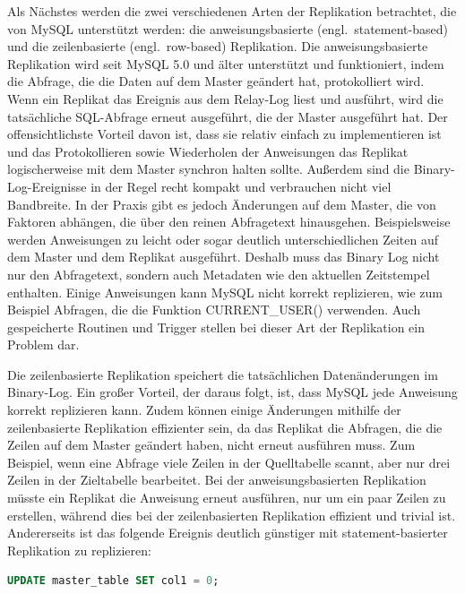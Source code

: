 Als Nächstes werden die zwei verschiedenen Arten der Replikation betrachtet, die von MySQL unterstützt werden: die anweisungsbasierte (engl.\ statement-based) und die zeilenbasierte (engl.\ row-based) Replikation.
Die anweisungsbasierte Replikation wird seit MySQL 5.0 und älter unterstützt und funktioniert, indem die Abfrage, die die Daten auf dem Master geändert hat, protokolliert wird.
Wenn ein Replikat das Ereignis aus dem Relay-Log liest und ausführt, wird die tatsächliche SQL-Abfrage erneut ausgeführt, die der Master ausgeführt hat.
Der offensichtlichste Vorteil davon ist, dass sie relativ einfach zu implementieren ist und das Protokollieren sowie Wiederholen der Anweisungen das Replikat logischerweise mit dem Master synchron halten sollte.
Außerdem sind die Binary-Log-Ereignisse in der Regel recht kompakt und verbrauchen nicht viel Bandbreite.
In der Praxis gibt es jedoch Änderungen auf dem Master, die von Faktoren abhängen, die über den reinen Abfragetext hinausgehen.
Beispielsweise werden Anweisungen zu leicht oder sogar deutlich unterschiedlichen Zeiten auf dem Master und dem Replikat ausgeführt.
Deshalb muss das Binary Log nicht nur den Abfragetext, sondern auch Metadaten wie den aktuellen Zeitstempel enthalten.
Einige Anweisungen kann MySQL nicht korrekt replizieren, wie zum Beispiel Abfragen, die die Funktion CURRENT\_USER() verwenden.
Auch gespeicherte Routinen und Trigger stellen bei dieser Art der Replikation ein Problem dar.

Die zeilenbasierte Replikation speichert die tatsächlichen Datenänderungen im Binary-Log.
Ein großer Vorteil, der daraus folgt, ist, dass MySQL jede Anweisung korrekt replizieren kann.
Zudem können einige Änderungen mithilfe der zeilenbasierte Replikation effizienter sein, da das Replikat die Abfragen, die die Zeilen auf dem Master geändert haben, nicht erneut ausführen muss.
Zum Beispiel, wenn eine Abfrage viele Zeilen in der Quelltabelle scannt, aber nur drei Zeilen in der Zieltabelle bearbeitet.
Bei der anweisungsbasierten Replikation müsste ein Replikat die Anweisung erneut ausführen, nur um ein paar Zeilen zu erstellen, während dies bei der zeilenbasierten Replikation effizient und trivial ist.
Andererseits ist das folgende Ereignis deutlich günstiger mit statement-basierter Replikation zu replizieren:

\vspace{-5pt}
\begin{lstlisting}[language=SQL]
UPDATE master_table SET col1 = 0;
\end{lstlisting}
\vspace{-5pt}

